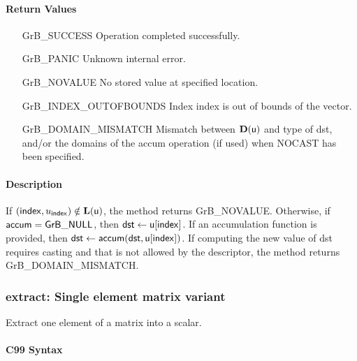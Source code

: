 \paragraph{Return Values}

\begin{itemize}[leftmargin=2.1in]
\item[{\sf GrB\_SUCCESS}]          Operation completed successfully.
\item[{\sf GrB\_PANIC}]            Unknown internal error.
\item[{\sf GrB\_NOVALUE}]        No stored value at specified location.
\item[{\sf GrB\_INDEX\_OUTOFBOUNDS}]  Index {\sf index} is out of 
                                      bounds of the vector. 
\item[{\sf GrB\_DOMAIN\_MISMATCH}]    Mismatch between $\bold{D}(\sf u)$ and type of {\sf dst},
                                      and/or the domains of the 
                                      {\sf accum} operation (if used) when {\sf NOCAST} has
                                      been specified.
\end{itemize}

\paragraph{Description}

If $({\sf index},u_{\sf index}) \notin \bold{L}({\sf u})$, the method returns {\sf GrB\_NOVALUE}.
Otherwise, if ${\sf accum} = {\sf GrB\_NULL}$, then ${\sf dst} \leftarrow {\sf u}[{\sf index}]$.
If an accumulation function is provided, then ${\sf dst} \leftarrow {\sf accum}({\sf dst},{\sf u}[{\sf index}])$.
If computing the new value of {\sf dst} requires casting and that is not allowed by the descriptor,
the method returns {\sf GrB\_DOMAIN\_MISMATCH}.


\subsubsection{{\sf extract}: Single element matrix variant}
\label{Sec:extract_single_element_mat}

Extract one element of a matrix into a scalar. 

\paragraph{C99 Syntax}

